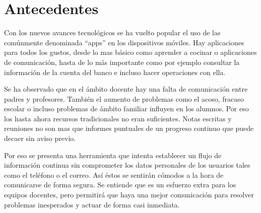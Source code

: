 %
%
%
%

\cleardoublepage
\chapter{Antecedentes}
\label{chap:record}

	Con los nuevos avances tecnológicos se ha vuelto popular el uso de las comúnmente denominada ``apps'' en los dispositivos móviles. Hay aplicaciones para todos los gustos, desde lo mas básico como aprender a cocinar o aplicaciones de comunicación, hasta de lo más importante como por ejemplo consultar la información de la cuenta del banco e incluso hacer operaciones con ella.
	
	\bigskip
	Se ha observado que en el ámbito docente hay una falta de comunicación entre padres y profesores. También el aumento de problemas como el acoso, fracaso escolar o incluso problemas de ámbito familiar influyen en los alumnos. Por eso los hasta ahora recursos tradicionales no eran suficientes. Notas escritas y reuniones no son mas que informes puntuales de un progreso continuo que puede decaer sin aviso previo.
	
	\bigskip
	Por eso se presenta una herramienta que intenta establecer un flujo de información continua sin comprometer los datos personales de los usuarios tales como el teléfono o el correo. Así éstos se sentirán cómodos a la hora de comunicarse de forma segura. Se entiende que es un esfuerzo extra para los equipos docentes, pero permitirá que haya una mejor comunicación para resolver problemas inesperados y actuar de forma casi inmediata.
